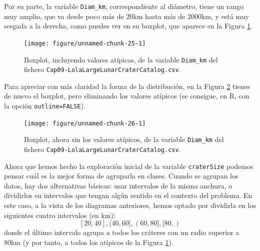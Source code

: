 \documentclass[10pt,a4paper]{article}\usepackage[]{graphicx}\usepackage[]{color}
\newenvironment{knitrout}{}{} %
\newcounter {cont01}
\begin{document}
Por su parte, la variable {\tt Diam\_km}, correspondiente al diámetro, tiene un rango muy amplio, que va desde poco más de 20km hasta más de 2000km, y está muy sesgada a la derecha, como puedes ver en su boxplot, que aparece en la Figura \ref{tut10:fig:BoxplotCrateres01}.
\begin{figure}[h!]
\begin{knitrout}
\color{fgcolor}

{\centering \texttt{[image: figure/unnamed-chunk-25-1]} 

}



\end{knitrout}
\caption{Boxplot, incluyendo valores atípicos, de la variable {\tt Diam\_km} del fichero {\tt Cap09-LolaLargeLunarCraterCatalog.csv}.}
\label{tut10:fig:BoxplotCrateres01}
\end{figure}

Para apreciar con más claridad la forma de la distribución, en la Figura \ref{tut10:fig:BoxplotCrateres02} tienes de nuevo el boxplot, pero eliminando los valores atípicos (se consigue, en R, con la opción {\tt outline=FALSE}).

\begin{figure}[h!]
\begin{knitrout}
\color{fgcolor}

{\centering \texttt{[image: figure/unnamed-chunk-26-1]} 

}



\end{knitrout}
\caption{Boxplot, ahora sin los  valores atípicos, de la variable {\tt Diam\_km} del fichero {\tt Cap09-LolaLargeLunarCraterCatalog.csv}.}
\label{tut10:fig:BoxplotCrateres02}
\end{figure}

Ahora que hemos hecho la exploración inicial de la variable {\tt craterSize} podemos pensar cuál es la mejor forma de agruparla en clases. Cuando se agrupan los datos, hay dos alternativas básicas: usar intervalos de la misma anchura, o dividirlos en intervalos que tengan algún sentido en el contexto del problema.  En este caso, a la vista de los diagramas anteriores, hemos optado por dividirla en los siguientes cuatro intervalos (en km):
\[
[20,40], (40,60], (60,80], [80, )
\]
donde el último intervalo agrupa a todos los cráteres con un radio superior a 80km (y por tanto, a todos los atípicos de la Figura \ref{tut10:fig:BoxplotCrateres01}).
\end{document}
